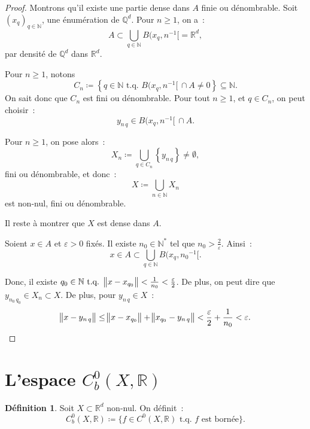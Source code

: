 \documentclass{report}
\theoremstyle{definition}
\newtheorem{déf}[thm]{Définition}
\theoremstyle{remark}
\numberwithin{equation}{section}
\newcommand{\R}{\mathbb R}
\newcommand{\Q}{\mathbb Q}
\newcommand{\N}{\mathbb N}
\newcommand{\Ns}{\N^{*}}
\newcommand{\tq}{\text{ t.q. }}
\begin{document}
			\begin{proof} Montrons qu'il existe une partie dense dans $A$ finie ou dénombrable. Soit $(x_q)_{q \in \N}$, une énumération de $\Q^d$. Pour $n \geq 1$,
			on a~:
			\begin{equation}
				A \subset \bigcup_{q \in \N}B(x_q, n^{-1}[ = \R^d,
			\end{equation}
			par densité de $\Q^d$ dans $\R^d$.

			Pour $n \geq 1$, notons
			\begin{equation}
				C_n \coloneqq \left\{q \in \N \tq B(x_q, n^{-1}[ \, \cap A \neq 0\right\} \subseteq \N.
			\end{equation}
			On sait donc que $C_n$ est fini ou dénombrable. Pour tout $n \geq 1$, et $q \in C_n$, on peut choisir~:
			\begin{equation}
				y_{n\,q} \in B(x_q, n^{-1}[ \, \cap A.
			\end{equation}

			Pour $n \geq 1$, on pose alors~:
			\begin{equation}
				X_n \coloneqq \bigcup_{q \in C_n}\left\{y_{n\,q}\right\} \neq \emptyset,
			\end{equation}
			fini ou dénombrable, et donc~:
			\begin{equation}
				X \coloneqq \bigcup_{n \in \N}X_n
			\end{equation}
			est non-nul, fini ou dénombrable.

			Il reste à montrer que $X$ est dense dans $A$.

			Soient $x \in A$ et $\varepsilon > 0$ fixés. Il existe $n_0 \in \Ns$ tel que $n_0 > \frac 2\varepsilon$. Ainsi~:
			\begin{equation}
				x \in A \subset \bigcup_{q \in \N}B(x_q, {n_0}^{-1}[.
			\end{equation}

			Donc, il existe $q_0 \in \N \tq \norm {x-x_{q_0}} < \frac 1{n_0} < \frac \varepsilon2$. De plus, on peut dire que $y_{n_0\,q_0} \in X_n \subset X$.
			De plus, pour $y_{n\,q} \in X$~:
			\begin{equation}
				\norm {x-y_{n\,q}} \leq \norm {x-x_{q_0}} + \norm {x_{q_0} - y_{n\,q}} < \frac \varepsilon2 + \frac 1{n_0} < \varepsilon.
			\end{equation}
			\end{proof}

	\section{L'espace $C_b^0(X, \R)$}
		\begin{déf} Soit $X \subset \R^d$ non-nul. On définit~:
		\begin{equation}
			C^0_b(X, \R) \coloneqq \{f \in C^0(X, \R) \tq f \text{ est bornée}\}.
		\end{equation}
		\end{déf}
\end{document}
